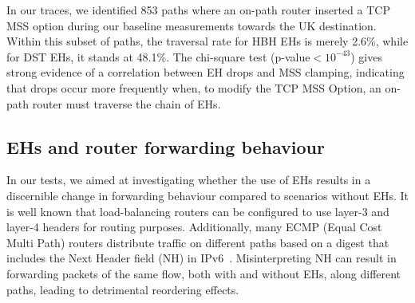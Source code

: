 \documentclass[conference]{IEEEtran}
\begin{document}
In our traces, we identified 853 paths where an on-path router inserted a TCP
MSS option during our baseline measurements towards the UK destination. Within
this subset of paths, the traversal rate for HBH EHs is merely 2.6\%, while for
DST EHs, it stands at 48.1\%. The chi-square test (p-value$<10^{-43}$) gives
strong evidence of a correlation between EH drops and MSS clamping, indicating
that drops occur more frequently when, to modify the TCP MSS Option, an on-path
router must traverse the chain of EHs. 




\subsection{EHs and router forwarding behaviour}

In our tests, we aimed at investigating whether the use of EHs results in a
discernible change in forwarding behaviour compared to scenarios without EHs.
It is well known that load-balancing routers can be configured to use
layer-3 and layer-4 headers for routing purposes. Additionally, many ECMP
(Equal Cost Multi Path) routers distribute traffic on different paths based on
a digest that includes the Next Header field (NH) in
IPv6~\cite{lb-classification}.  Misinterpreting NH can result in forwarding
packets of the same flow, both with and without EHs, along different paths,
leading to detrimental reordering effects.

% 

\end{document}
